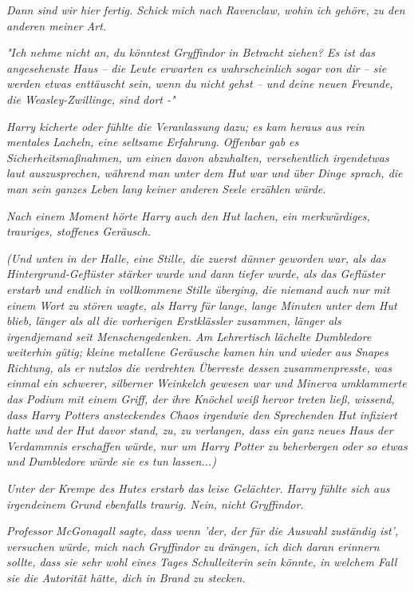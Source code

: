 {\emph{Dann sind wir hier fertig. Schick mich nach Ravenclaw, wohin ich gehöre, zu den anderen meiner Art.}

\emph{"Ich nehme nicht an, du könntest Gryffindor in Betracht ziehen? Es ist das angesehenste Haus -- die Leute erwarten es wahrscheinlich sogar von dir -- sie werden etwas enttäuscht sein, wenn du nicht gehst -- und deine neuen Freunde, die Weasley-Zwillinge, sind dort -"}

\emph{Harry kicherte oder fühlte die Veranlassung dazu; es kam heraus aus rein mentales Lacheln, eine seltsame Erfahrung. Offenbar gab es Sicherheitsmaßnahmen, um einen davon abzuhalten, versehentlich irgendetwas laut auszusprechen, während man unter dem Hut war und über Dinge sprach, die man sein ganzes Leben lang keiner anderen Seele erzählen würde.}

\emph{Nach einem Moment hörte Harry auch den Hut lachen, ein merkwürdiges, trauriges, stoffenes Geräusch.}

\emph{(Und unten in der Halle, eine Stille, die zuerst dünner geworden war, als das Hintergrund-Geflüster stärker wurde und dann tiefer wurde, als das Geflüster erstarb und endlich in vollkommene Stille überging, die niemand} \emph{auch nur mit einem Wort zu stören wagte, als Harry für lange, lange Minuten unter dem Hut blieb, länger als all die vorherigen Erstklässler zusammen, länger als irgendjemand seit Menschengedenken. Am Lehrertisch lächelte Dumbledore weiterhin gütig; kleine metallene Geräusche kamen hin und wieder aus Snapes Richtung, als er nutzlos die verdrehten Überreste dessen zusammenpresste, was einmal ein schwerer, silberner Weinkelch gewesen war und Minerva umklammerte das Podium mit einem Griff, der ihre Knöchel weiß hervor treten ließ, wissend, dass Harry Potters ansteckendes Chaos irgendwie den Sprechenden Hut infiziert hatte und der Hut davor stand, zu, zu verlangen, dass ein ganz neues Haus der Verdammnis erschaffen würde, nur um Harry Potter zu beherbergen oder so etwas und} \emph{\emph{Dumbledore würde sie es tun lassen...)}}

\emph{Unter der Krempe des Hutes erstarb das leise Gelächter. Harry fühlte sich aus irgendeinem Grund ebenfalls traurig. Nein, nicht Gryffindor.}

\emph{\emph{Professor McGonagall sagte, dass wenn 'der, der für die Auswahl zuständig ist', versuchen würde, mich nach Gryffindor zu drängen, ich dich daran erinnern sollte, dass sie sehr wohl eines Tages Schulleiterin sein könnte, in welchem Fall sie die Autorität hätte, dich in Brand zu stecken.}}

}
